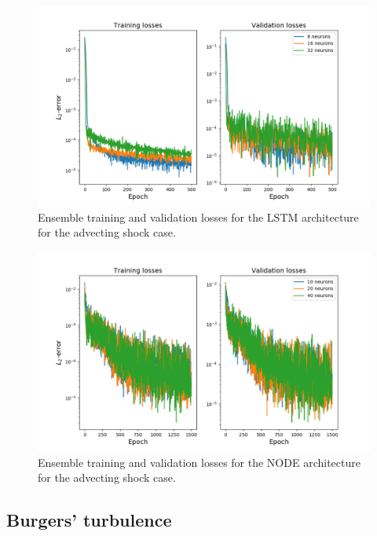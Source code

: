 \documentclass[preprint,12pt]{elsarticle}
\begin{document}
\begin{figure}
	\centering
	\includegraphics[width=\textwidth]{Figure_10.pdf}
	\caption{Ensemble training and validation losses for the LSTM architecture for the advecting shock case.}
	\label{Figure7}
\end{figure}

\begin{figure}
	\centering
	\includegraphics[width=\textwidth]{Figure_11.pdf}
	\caption{Ensemble training and validation losses for the NODE architecture for the advecting shock case.}
	\label{Figure8}
\end{figure}

\subsection{Burgers' turbulence}
\end{document}
